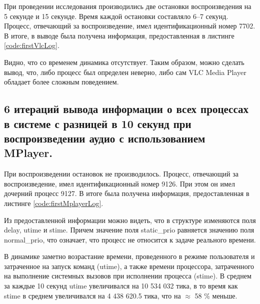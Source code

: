 При проведении исследования производились две остановки воспроизведения на 5 секунде и 15 секунде. Время каждой остановки составляло 6--7 секунд. Процесс, отвечающий за воспроизведение, имел идентификационный номер 7702. В итоге, в выводе была получена информация, предоставленная в листинге \ref{code:firstVlcLog}.


Видно, что со временем динамика отсутствует. Таким образом, можно сделать вывод, что, либо процесс был определен неверно, либо сам VLC Media Player обладает более сложным поведением.

\subsection{6 итераций вывода информации о всех процессах в системе с разницей в 10 секунд при воспроизведении аудио с использованием MPlayer. }
При воспроизведении остановок не производилось. Процесс, отвечающий за воспроизведение, имел идентификационный номер 9126. При этом он имел дочерний процесс 9127. В итоге была получена информация, предоставленная в листинге \ref{code:firstMplayerLog}.


Из предоставленной информации можно видеть, что в структуре изменяются поля delay, utime и stime. Причем значение поля static\_prio равняется значению поля normal\_prio, что означает, что процесс не относится к задаче реального времени.

В динамике заметно возрастание времени, проведенного в режиме пользователя и затраченное на запуск команд (utime), а также времени процессора, затраченного на выполнение системных вызовов при исполнении процесса (stime). В среднем за каждые 10 секунд utime увеличивался на 10 534 032 тика, в то время как stime в среднем увеличивался на 4 438 620.5 тика, что на $\approx$ 58 \% меньше.

